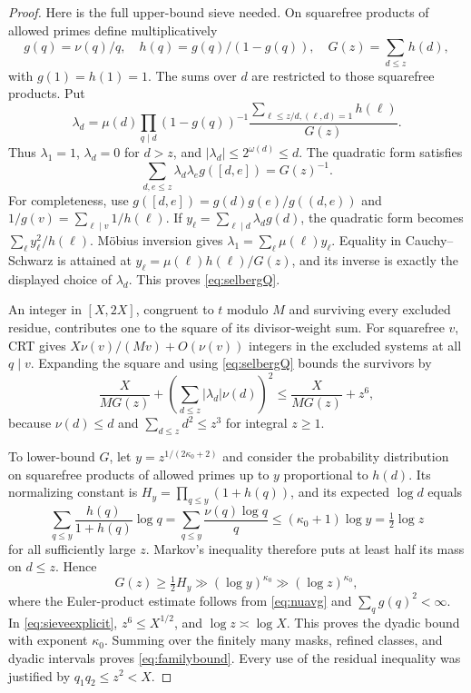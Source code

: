 \documentclass[11pt]{article}
\theoremstyle{remark}\newtheorem{remark}[theorem]{Remark}
\begin{document}
\begin{proof}
Here is the full upper-bound sieve needed. On squarefree products of allowed primes define multiplicatively
\[
 g(q)=\nu(q)/q,\quad h(q)=g(q)/(1-g(q)),\quad
 G(z)=\sum_{d\le z}h(d),
\]
with $g(1)=h(1)=1$. The sums over $d$ are restricted to those squarefree products. Put
\[
 \lambda_d=\mu(d)\prod_{q\mid d}(1-g(q))^{-1}
 \frac{\sum_{\ell\le z/d,(\ell,d)=1}h(\ell)}{G(z)}.
\]
Thus $\lambda_1=1$, $\lambda_d=0$ for $d>z$, and $|\lambda_d|\le2^{\omega(d)}\le d$.
The quadratic form satisfies
\begin{equation}\label{eq:selbergQ}
 \sum_{d,e\le z}\lambda_d\lambda_e g([d,e])=G(z)^{-1}.
\end{equation}
For completeness, use
$g([d,e])=g(d)g(e)/g((d,e))$ and
$1/g(v)=\sum_{\ell\mid v}1/h(\ell)$. If
$y_\ell=\sum_{\ell\mid d}\lambda_dg(d)$, the quadratic form becomes
$\sum_\ell y_\ell^2/h(\ell)$. M\"obius inversion gives
$\lambda_1=\sum_\ell\mu(\ell)y_\ell$. Equality in Cauchy--Schwarz is attained at
$y_\ell=\mu(\ell)h(\ell)/G(z)$, and its inverse is exactly the displayed choice of $\lambda_d$. This proves \eqref{eq:selbergQ}.

An integer in $[X,2X]$, congruent to $t$ modulo $M$ and surviving every excluded residue, contributes one to the square of its divisor-weight sum. For squarefree $v$, CRT gives $X\nu(v)/(Mv)+O(\nu(v))$ integers in the excluded systems at all $q\mid v$. Expanding the square and using \eqref{eq:selbergQ} bounds the survivors by
\begin{equation}\label{eq:sieveexplicit}
 \frac{X}{M G(z)}+
 \left(\sum_{d\le z}|\lambda_d|\nu(d)\right)^2
 \le\frac{X}{M G(z)}+z^6,
\end{equation}
because $\nu(d)\le d$ and $\sum_{d\le z}d^2\le z^3$ for integral $z\ge1$.

To lower-bound $G$, let $y=z^{1/(2\kappa_0+2)}$ and consider the probability distribution on squarefree products of allowed primes up to $y$ proportional to $h(d)$. Its normalizing constant is
$H_y=\prod_{q\le y}(1+h(q))$, and its expected $\log d$ equals
\[
 \sum_{q\le y}\frac{h(q)}{1+h(q)}\log q
 =\sum_{q\le y}\frac{\nu(q)\log q}{q}
 \le(\kappa_0+1)\log y=\tfrac12\log z
\]
for all sufficiently large $z$. Markov's inequality therefore puts at least half its mass on $d\le z$. Hence
\[
 G(z)\ge\tfrac12 H_y\gg(\log y)^{\kappa_0}\gg(\log z)^{\kappa_0},
\]
where the Euler-product estimate follows from \eqref{eq:nuavg} and $\sum_qg(q)^2<\infty$. In \eqref{eq:sieveexplicit}, $z^6\le X^{1/2}$, and $\log z\asymp\log X$. This proves the dyadic bound with exponent $\kappa_0$. Summing over the finitely many masks, refined classes, and dyadic intervals proves \eqref{eq:familybound}. Every use of the residual inequality was justified by $q_1q_2\le z^2<X$.
\end{proof}
\end{document}
